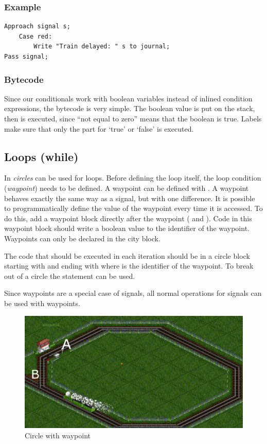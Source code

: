 \subsubsection*{Example}

\begin{lstlisting}
Approach signal s;
	Case red:
		Write "Train delayed: " s to journal;
Pass signal;
\end{lstlisting}

\subsubsection*{Bytecode}

Since our conditionals work with boolean variables instead of inlined condition expressions, the bytecode is very simple. The boolean value is put on the stack, then  is executed, since ``not equal to zero'' means that the boolean is true. Labels make sure that only the part for `true' or `false' is executed.

\subsection{Loops (while)}

In \shortname \emph{circles} can be used for loops. Before defining the loop itself, the loop condition (\emph{waypoint}) needs to be defined. A waypoint can be defined with . A waypoint behaves exactly the same way as a signal, but with one difference. It is possible to programmatically define the value of the waypoint every time it is accessed. To do this, add a waypoint block directly after the waypoint ( and ). Code in this waypoint block should write a boolean value to the identifier of the waypoint. Waypoints can only be declared in the  city block.

The code that should be executed in each iteration should be in a circle block starting with  and ending with  where  is the identifier of the waypoint. To break out of a circle the statement  can be used.

Since waypoints are a special case of signals, all normal operations for signals can be used with waypoints.

\begin{figure}[t]
\centering
\includegraphics[scale=0.25]{Images/circle}
\caption{Circle with waypoint}
\label{fig:circle}
\end{figure}

